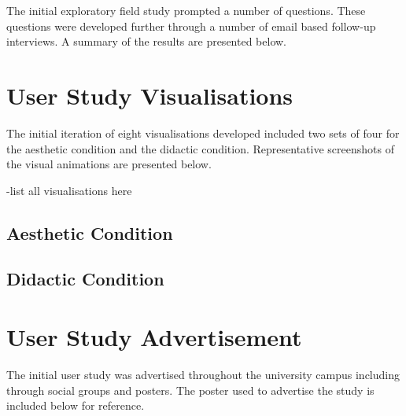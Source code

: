 The initial exploratory field study prompted a number of questions. These questions were developed further through a number of email based follow-up interviews. A summary of the results are presented below.




\chapter{User Study Visualisations}
\label{appendix:user-study-visualisations}

The initial iteration of eight visualisations developed included two sets of four for the aesthetic condition and the didactic condition. Representative screenshots of the visual animations are presented below.

-list all visualisations here

\section*{Aesthetic Condition}

\section*{Didactic Condition}



\chapter{User Study Advertisement}
\label{appendix:user-study-advertisement}

The initial user study was advertised throughout the university campus including through social groups and posters. The poster used to advertise the study is included below for reference.

